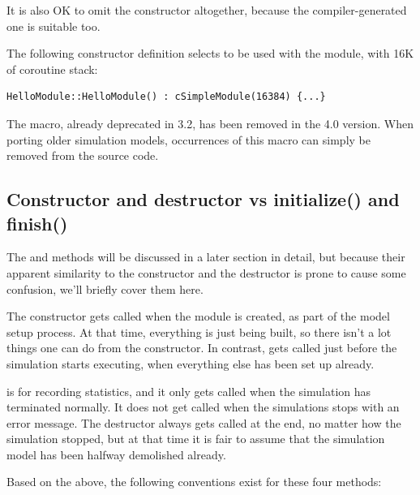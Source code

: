 It is also OK to omit the constructor altogether, because the
compiler-generated one is suitable too.

The following constructor definition selects  to be used
with the module, with 16K of coroutine stack:

\begin{verbatim}
HelloModule::HelloModule() : cSimpleModule(16384) {...}
\end{verbatim}

\begin{note}
    The  macro, already deprecated in {\opp} 3.2,
    has been removed in the 4.0 version. When porting older simulation models,
    occurrences of this macro can simply be removed from the source code.
\end{note}



\subsection{Constructor and destructor vs initialize() and finish()}
\label{sec:simple-modules:ctor-dtor-init-finish}

The  and  methods will be discussed
in a later section in detail, but because their apparent similarity
to the constructor and the destructor is prone to cause some confusion,
we'll briefly cover them here.

The constructor gets called when the module is created, as part of the
model setup process. At that time, everything is just being built,
so there isn't a lot things one can do from the constructor.
In contrast,  gets called just before the
simulation starts executing, when everything else has been set up
already.

 is for recording statistics, and it only gets called
when the simulation has terminated normally. It does not get called when
the simulations stops with an error message. The destructor always
gets called at the end, no matter how the simulation stopped, but
at that time it is fair to assume that the simulation model has been
halfway demolished already.

Based on the above, the following conventions exist for these four methods:

